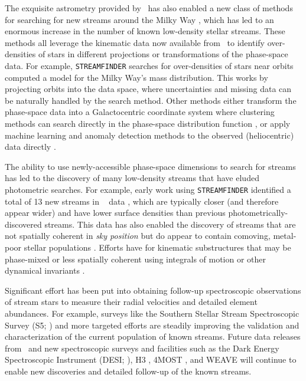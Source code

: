 \documentclass[final,5p,times,twocolumn,authoryear]{elsarticle}
\begin{document}
The exquisite astrometry provided by \gaia\ has also enabled a new class of methods for
searching for new streams around the Milky Way \citep[e.g.,][]{malhan:2018a,
borsato:2020, necib:2020, gatto:2020, shih:2022, shih:2023, pettee:2024}, which has led
to an enormous increase in the number of known low-density stellar streams.
These methods all leverage the kinematic data now available from \gaia\ to identify
over-densities of stars in different projections or transformations of the phase-space
data.
For example, \texttt{STREAMFINDER} \citep{malhan:2018a} searches for over-densities of
stars near orbits computed  a model for the Milky Way's mass distribution.
This works by projecting orbits into the data space, where uncertainties and missing
data can be naturally handled by the search method.
Other methods either transform the phase-space data into a Galactocentric coordinate
system where clustering methods can search directly in the phase-space distribution
function \citep{necib:2020,gatto:2020}, or apply machine learning and anomaly detection
methods to the observed (heliocentric) data directly \citep{borsato:2020, shih:2022,
shih:2023, pettee:2024}.

The ability to use newly-accessible phase-space dimensions to search for streams has led
to the discovery of many low-density streams that have eluded photometric searches.
For example, early work using \texttt{STREAMFINDER} identified a total of 13 new streams
in \gaia\  data \citep{malhan:2018, ibata:2018, ibata:2019}, which are typically
closer (and therefore appear wider) and have lower surface densities than previous
photometrically-discovered streams.
This data has also enabled the discovery of streams that are not spatially coherent in
\emph{sky position} but do appear to contain comoving, metal-poor stellar populations
\citep[e.g.,][]{necib:2020b, balbinot:2023}.
Efforts have  for kinematic substructures that may be phase-mixed or less
spatially coherent using integrals of motion or other dynamical invariants
\citep[e.g.,][]{koppelman:2019b, yuan:2020, naidu:2020, malhan:2022c, ou:2023,
malhan:2024}.

Significant effort has been put into obtaining follow-up spectroscopic observations of stream stars to measure their radial velocities and detailed element abundances.
For example, surveys like the Southern Stellar Stream Spectroscopic Survey (S5;
\citep{li:2019,li:2022}) and more targeted efforts \citep[e.g.,][]{ibata:2021} are
steadily improving the validation and characterization of the current population of
known streams.
Future data releases from \gaia\ and new spectroscopic surveys and facilities such as
the Dark Energy Spectroscopic Instrument (DESI; \citealt{desi:2016}), H3
\citep{conroy:2019}, 4MOST \citep{4most:2012}, and WEAVE \citep{weave:2012} will
continue to enable new discoveries and detailed follow-up of the known streams.
\end{document}

